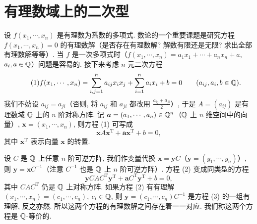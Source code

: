\section{有理数域上的二次型}\label{sec:ch9-s3}

设 $f(x_1,\cdots,x_n)$ 是有理数为系数的多项式. 数论的一个重要课题是研究方程 $f(x_1,\cdots,x_n)=0$ 的有理数解（是否存在有理数解? 解数有限还是无限? 求出全部有理数解等等）. 当 $f$ 是一次多项式时（$f(x_1,\cdots,x_n)=a_1x_1+\cdots+a_nx_n+a$, $a_i,a\in\mathbb{Q}$）问题是容易的. 接下来考虑 $n$ 元二次方程
\begin{equation}\tag{1}
  f(x_1,\cdots,x_n)=\sum_{i,j=1}^{n}a_{ij}x_ix_j
  +\sum_{i=1}^{n}a_ix_i+b=0\qquad(a_{ij},a_i,b\in\mathbb{Q}).
\end{equation}
我们不妨设 $a_{ij}=a_{ji}$（否则, 将 $a_{ij}$ 和 $a_{ji}$ 都改用 $\frac{a_{ij}+a_{ji}}{2}$）, 于是 $A=(a_{ij})$ 是有理数域 $\mathbb{Q}$ 上的 $n$ 阶对称方阵. 记 $\boldsymbol{a}=(a_1,\cdots,a_n)\in\mathbb{Q}^n$（$\mathbb{Q}$ 上 $n$ 维空间中的向量）, $\boldsymbol{x}=(x_1,\cdots,x_n)$, 则方程 (1) 可写成
\begin{equation}\tag{2}
  \boldsymbol{x}A\boldsymbol{x}^{\mathrm{T}}+\boldsymbol{a}\boldsymbol{x}^{\mathrm{T}}+b=0,
\end{equation}
其中 $\boldsymbol{x}^{\mathrm{T}}$ 表示向量 $\boldsymbol{x}$ 的转置.

设 $C$ 是 $\mathbb{Q}$ 上任意 $n$ 阶可逆方阵, 我们作变量代换 $\boldsymbol{x}=\boldsymbol{y}C$（$\boldsymbol{y}=(y_1,\cdots,y_n)$）, 则 $\boldsymbol{y}=\boldsymbol{x}C^{-1}$（注意 $C^{-1}$ 也是 $\mathbb{Q}$ 上 $n$ 阶可逆方阵）. 方程 (2) 变成同类型的方程
\begin{equation}\tag{3}
  \boldsymbol{y}CAC^{\mathrm{T}}\boldsymbol{y}^{\mathrm{T}}
  +\boldsymbol{a}C^{\mathrm{T}}\boldsymbol{y}^{\mathrm{T}}+b=0,
\end{equation}
其中 $CAC^{\mathrm{T}}$ 仍是 $\mathbb{Q}$ 上对称方阵. 如果方程 (2) 有有理解 $(x_1,\cdots,x_n)=(c_1,\cdots,c_n)$, $c_i\in\mathbb{Q}$, 则 $\boldsymbol{y}=(c_1,\cdots,c_n)C^{-1}$ 是方程 (3) 的一组有理解, 反之亦然. 所以这两个方程的有理数解之间存在着一一对应. 我们称这两个方程是 $\mathbb{Q}$-等价的.


